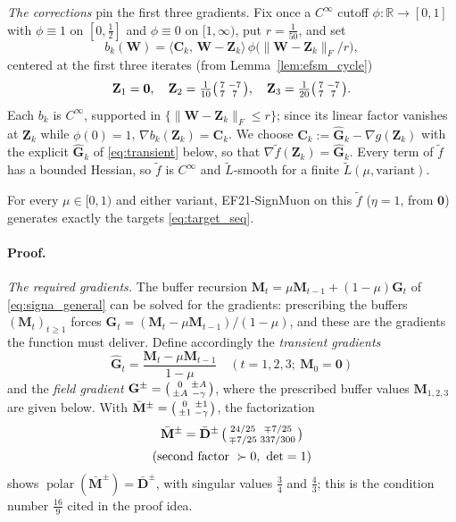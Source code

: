 \emph{The corrections} pin the first three gradients. Fix once a $C^\infty$
cutoff $\phi\colon\mathbb R\to[0,1]$ with $\phi\equiv1$ on $[0,\tfrac12]$ and
$\phi\equiv0$ on $[1,\infty)$, put $r=\tfrac1{50}$, and set
\begin{equation}\label{eq:bump}
b_k(\mathbf W)=\bigl\langle\mathbf C_k,\,\mathbf W-\mathbf Z_k\bigr\rangle\,
\phi\!\bigl(\|\mathbf W-\mathbf Z_k\|_F/r\bigr),
\end{equation}
centered at the first three iterates (from Lemma~\ref{lem:efsm_cycle})
\[
\mathbf Z_1=\mathbf 0,\quad
\mathbf Z_2=\tfrac1{10}\bigl(\begin{smallmatrix}7&-7\\7&7\end{smallmatrix}\bigr),\quad
\mathbf Z_3=\tfrac1{20}\bigl(\begin{smallmatrix}7&-7\\7&7\end{smallmatrix}\bigr).
\]
Each $b_k$ is $C^\infty$, supported in $\{\|\mathbf W-\mathbf Z_k\|_F\le r\}$;
since its linear factor vanishes at $\mathbf Z_k$ while $\phi(0)=1$,
$\nabla b_k(\mathbf Z_k)=\mathbf C_k$. We choose
$\mathbf C_k:=\hat{\mathbf G}_k-\nabla g(\mathbf Z_k)$ with the explicit
$\hat{\mathbf G}_k$ of \eqref{eq:transient} below, so that
$\nabla\tilde f(\mathbf Z_k)=\hat{\mathbf G}_k$. Every term of $\tilde f$ has a
bounded Hessian, so $\tilde f$ is $C^\infty$ and $\tilde L$-smooth for a finite
$\tilde L(\mu,\text{variant})$.

\begin{lemma}[Realization]\label{lem:efsm_realize}
For every $\mu\in[0,1)$ and either variant, EF21-SignMuon on this $\tilde f$
($\eta=1$, from $\mathbf 0$) generates exactly the targets
\eqref{eq:target_seq}.
\end{lemma}
\paragraph{Proof.}
\emph{The required gradients.} The buffer recursion
$\mathbf M_t=\mu\mathbf M_{t-1}+(1-\mu)\mathbf G_t$ of \eqref{eq:signa_general}
can be solved for the gradients: prescribing the buffers $(\mathbf M_t)_{t\ge1}$
forces $\mathbf G_t=(\mathbf M_t-\mu\mathbf M_{t-1})/(1-\mu)$, and these are
the gradients the function must deliver. Define accordingly the
\emph{transient gradients}
\begin{equation}\label{eq:transient}
\hat{\mathbf G}_t=\frac{\mathbf M_t-\mu\mathbf M_{t-1}}{1-\mu}\quad(t=1,2,3;\ \mathbf M_0=\mathbf 0)
\end{equation}
and the \emph{field gradient}
$\mathbf G^{\pm}=\bigl(\begin{smallmatrix}0&\pm A\\\pm A&-\gamma\end{smallmatrix}\bigr)$, where the prescribed buffer
values $\mathbf M_{1,2,3}$ are given below. With
$\bar{\mathbf M}^{\pm}=\bigl(\begin{smallmatrix}0&\pm1\\\pm1&-\gamma\end{smallmatrix}\bigr)$, the factorization
\begin{equation}\label{eq:polarM}
\begin{gathered}
\bar{\mathbf M}^{\pm}
=\bar{\mathbf D}^{\pm}\,\bigl(\begin{smallmatrix}24/25&\mp7/25\\\mp7/25&337/300\end{smallmatrix}\bigr)\\
(\text{second factor }\succ0,\ \det=1)
\end{gathered}
\end{equation}
shows $\operatorname{polar}(\bar{\mathbf M}^{\pm})=\bar{\mathbf D}^{\pm}$, with
singular values $\tfrac34$ and $\tfrac43$; this is the condition number
$\tfrac{16}9$ cited in the proof idea.

